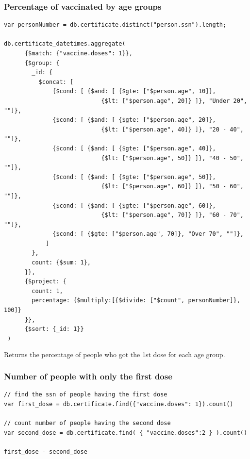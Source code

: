 \documentclass[12pt, a4paper]{article}
\begin{document}
\subsubsection{Percentage of vaccinated by age groups}
\begin{tcolorbox}[fontupper=\scriptsize]
    \begin{verbatim}
var personNumber = db.certificate.distinct("person.ssn").length;

db.certificate_datetimes.aggregate(
      {$match: {"vaccine.doses": 1}},
      {$group: {
        _id: {
          $concat: [
              {$cond: [ {$and: [ {$gte: ["$person.age", 10]},
                            {$lt: ["$person.age", 20]} ]}, "Under 20", ""]},
              {$cond: [ {$and: [ {$gte: ["$person.age", 20]}, 
                            {$lt: ["$person.age", 40]} ]}, "20 - 40", ""]},
              {$cond: [ {$and: [ {$gte: ["$person.age", 40]}, 
                            {$lt: ["$person.age", 50]} ]}, "40 - 50", ""]},
              {$cond: [ {$and: [ {$gte: ["$person.age", 50]}, 
                            {$lt: ["$person.age", 60]} ]}, "50 - 60", ""]},
              {$cond: [ {$and: [ {$gte: ["$person.age", 60]}, 
                            {$lt: ["$person.age", 70]} ]}, "60 - 70", ""]},
              {$cond: [ {$gte: ["$person.age", 70]}, "Over 70", ""]},
            ]
        },
        count: {$sum: 1},
      }},
      {$project: {
        count: 1,
        percentage: {$multiply:[{$divide: ["$count", personNumber]}, 100]}
      }},
      {$sort: {_id: 1}}
 )
    \end{verbatim}
\end{tcolorbox}
\noindent 
Returns the percentage of people who got the 1st dose for each age group.

\subsubsection{Number of people with only the first dose}
\begin{tcolorbox}[fontupper=\scriptsize]
    \begin{verbatim}
// find the ssn of people having the first dose
var first_dose = db.certificate.find({"vaccine.doses": 1}).count()

// count number of people having the second dose
var second_dose = db.certificate.find( { "vaccine.doses":2 } ).count()

first_dose - second_dose
    \end{verbatim}
\end{tcolorbox}
\end{document}
